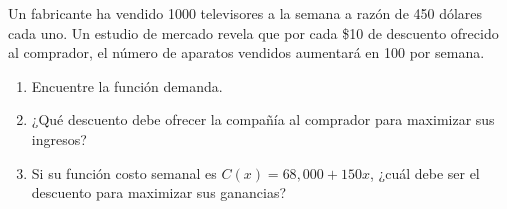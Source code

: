 \item Un fabricante ha vendido 1000 televisores a la semana a razón de 450 dólares cada uno. Un estudio de mercado revela que por cada \$10 de descuento ofrecido al comprador, el número de aparatos vendidos aumentará en 100 por semana.
\begin{enumerate}
    \item[(a)] Encuentre la función demanda.
    \item[(b)] ¿Qué descuento debe ofrecer la compañía al comprador para maximizar sus ingresos?
    \item[(c)] Si su función costo semanal es $C(x) = 68,000 + 150x$, ¿cuál debe ser el descuento para maximizar sus ganancias?
\end{enumerate}
